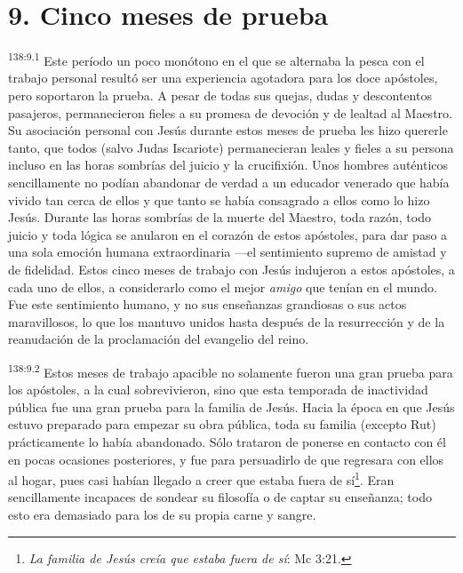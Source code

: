 \section*{9. Cinco meses de prueba}
\par 
\textsuperscript{138:9.1} Este período un poco monótono en el que se alternaba la pesca con el trabajo personal resultó ser una experiencia agotadora para los doce apóstoles, pero soportaron la prueba. A pesar de todas sus quejas, dudas y descontentos pasajeros, permanecieron fieles a su promesa de devoción y de lealtad al Maestro. Su asociación personal con Jesús durante estos meses de prueba les hizo quererle tanto, que todos
(salvo Judas Iscariote) permanecieran leales y fieles a su persona incluso en las horas sombrías del juicio y la crucifixión. Unos hombres auténticos sencillamente no podían abandonar de verdad a un educador venerado que había vivido tan cerca de ellos y que tanto se había consagrado a ellos como lo hizo Jesús. Durante las horas sombrías de la muerte del Maestro, toda razón, todo juicio y toda lógica se anularon en el corazón de estos apóstoles, para dar paso a una sola emoción humana extraordinaria ---el sentimiento supremo de amistad y de fidelidad. Estos cinco meses de trabajo con Jesús indujeron a estos apóstoles, a cada uno de ellos, a considerarlo como el mejor \textit{amigo} que tenían en el mundo. Fue este sentimiento humano, y no sus enseñanzas grandiosas o sus actos maravillosos, lo que los mantuvo unidos hasta después de la resurrección y de la reanudación de la proclamación del evangelio del reino.

\par 
\textsuperscript{138:9.2} Estos meses de trabajo apacible no solamente fueron una gran prueba para los apóstoles, a la cual sobrevivieron, sino que esta temporada de inactividad pública fue una gran prueba para la familia de Jesús. Hacia la época en que Jesús estuvo preparado para empezar su obra pública, toda su familia (excepto Rut) prácticamente lo había abandonado. Sólo trataron de ponerse en contacto con él en pocas ocasiones posteriores, y fue para persuadirlo de que regresara con ellos al hogar, pues casi habían llegado a creer que estaba fuera de sí\footnote{\textit{La familia de Jesús creía que estaba fuera de sí}: Mc 3:21.}. Eran sencillamente incapaces de sondear su filosofía o de captar su enseñanza; todo esto era demasiado para los de su propia carne y sangre.

